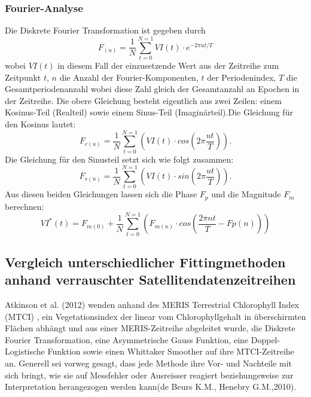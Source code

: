 \documentclass[11pt]{report}
\begin{document}
\subsubsection{Fourier-Analyse}
Die Diskrete Fourier Transformation ist gegeben durch
\begin{equation}
F_{(u)}=\frac{1}{N}\sum_{t=0}^{N=1}VI(t)\cdot e^{-2\pi ut/T}
\end{equation}
wobei $VI(t)$ in diesem Fall der einzusetzende Wert aus der Zeitreihe zum Zeitpunkt $t$, $n$ die Anzahl der Fourier-Komponenten, $t$ der Periodenindex, $T$ die Gesamtperiodenanzahl wobei diese Zahl gleich der Gesamtanzahl an Epochen in der Zeitreihe. Die obere Gleichung besteht eigentlich aus zwei Zeilen: einem Kosinus-Teil (Realteil) sowie einem Sinus-Teil (Imaginärteil).Die Gleichung für den Kosinus lautet:
\begin{equation}
F_{c(u)}=\frac{1}{N}\sum_{t=0}^{N=1}\left(VI(t)\cdot cos\left(2\pi\frac{ut}{T}\right)\right).
\end{equation}
Die Gleichung für den Sinusteil setzt sich wie folgt zusammen:
\begin{equation}
F_{s(u)}=\frac{1}{N}\sum_{t=0}^{N=1}\left(VI(t)\cdot sin\left(2\pi\frac{ut}{T}\right)\right).
\end{equation}
Aus diesen beiden Gleichungen lassen sich die Phase $F_p$ und die Magnitude $F_m$ berechnen:
\begin{equation}
VI^*(t)=F_{m(0)} + \frac{1}{N}\sum_{t=0}^{N=1}\left(F_{m(n)} \cdot cos\left(\frac{2\pi nt}{T}-F{p(n)}\right)\right)
\end{equation}



%
\subsection{Vergleich unterschiedlicher Fittingmethoden anhand verrauschter Satellitendatenzeitreihen}
Atkinson et al. (2012) wenden anhand des MERIS Terrestrial Chlorophyll Index (MTCI) , ein Vegetationsindex der linear vom Chlorophyllgehalt in überschirmten Flächen abhängt und aus einer MERIS-Zeitreihe abgeleitet wurde, die Diskrete Fourier Transformation, eine Asymmetrische Gauss Funktion, eine Doppel-Logistische Funktion sowie einen Whittaker Smoother auf ihre MTCI-Zeitreihe an. Generell sei vorweg gesagt, dass jede Methode ihre Vor- und Nachteile mit sich bringt, wie sie auf Messfehler oder Ausreisser reagiert beziehungsweise zur Interpretation herangezogen werden kann(de Beurs K.M., Henebry G.M.,2010). \newline
\end{document}
